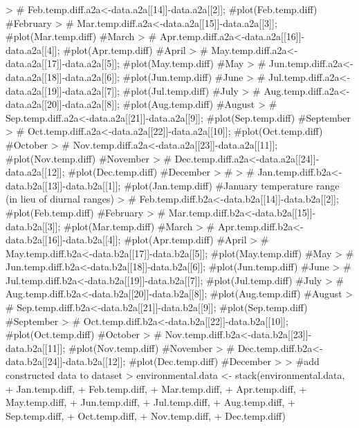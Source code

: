 \documentclass[10pt]{article}
\renewenvironment{Schunk}{\vspace{\topsep}}{\vspace{\topsep}}
\begin{document}
\begin{Schunk}
\begin{Sinput}
> # Feb.temp.diff.a2a<-data.a2a[[14]]-data.a2a[[2]];  #plot(Feb.temp.diff)  #February
> # Mar.temp.diff.a2a<-data.a2a[[15]]-data.a2a[[3]];  #plot(Mar.temp.diff)  #March
> # Apr.temp.diff.a2a<-data.a2a[[16]]-data.a2a[[4]];  #plot(Apr.temp.diff)  #April
> # May.temp.diff.a2a<-data.a2a[[17]]-data.a2a[[5]];  #plot(May.temp.diff)  #May
> # Jun.temp.diff.a2a<-data.a2a[[18]]-data.a2a[[6]];  #plot(Jun.temp.diff)  #June
> # Jul.temp.diff.a2a<-data.a2a[[19]]-data.a2a[[7]];  #plot(Jul.temp.diff)  #July
> # Aug.temp.diff.a2a<-data.a2a[[20]]-data.a2a[[8]];  #plot(Aug.temp.diff)  #August
> # Sep.temp.diff.a2a<-data.a2a[[21]]-data.a2a[[9]];  #plot(Sep.temp.diff)  #September
> # Oct.temp.diff.a2a<-data.a2a[[22]]-data.a2a[[10]]; #plot(Oct.temp.diff)  #October
> # Nov.temp.diff.a2a<-data.a2a[[23]]-data.a2a[[11]]; #plot(Nov.temp.diff)  #November
> # Dec.temp.diff.a2a<-data.a2a[[24]]-data.a2a[[12]]; #plot(Dec.temp.diff)  #December
> # 
> # Jan.temp.diff.b2a<-data.b2a[[13]]-data.b2a[[1]];  #plot(Jan.temp.diff)  #January temperature range (in lieu of diurnal ranges)
> # Feb.temp.diff.b2a<-data.b2a[[14]]-data.b2a[[2]];  #plot(Feb.temp.diff)  #February
> # Mar.temp.diff.b2a<-data.b2a[[15]]-data.b2a[[3]];  #plot(Mar.temp.diff)  #March
> # Apr.temp.diff.b2a<-data.b2a[[16]]-data.b2a[[4]];  #plot(Apr.temp.diff)  #April
> # May.temp.diff.b2a<-data.b2a[[17]]-data.b2a[[5]];  #plot(May.temp.diff)  #May
> # Jun.temp.diff.b2a<-data.b2a[[18]]-data.b2a[[6]];  #plot(Jun.temp.diff)  #June
> # Jul.temp.diff.b2a<-data.b2a[[19]]-data.b2a[[7]];  #plot(Jul.temp.diff)  #July
> # Aug.temp.diff.b2a<-data.b2a[[20]]-data.b2a[[8]];  #plot(Aug.temp.diff)  #August
> # Sep.temp.diff.b2a<-data.b2a[[21]]-data.b2a[[9]];  #plot(Sep.temp.diff)  #September
> # Oct.temp.diff.b2a<-data.b2a[[22]]-data.b2a[[10]]; #plot(Oct.temp.diff)  #October
> # Nov.temp.diff.b2a<-data.b2a[[23]]-data.b2a[[11]]; #plot(Nov.temp.diff)  #November
> # Dec.temp.diff.b2a<-data.b2a[[24]]-data.b2a[[12]]; #plot(Dec.temp.diff)  #December
> 
> #add constructed data to dataset
> environmental.data <- stack(environmental.data,
+                             Jan.temp.diff,
+                             Feb.temp.diff,
+                             Mar.temp.diff,
+                             Apr.temp.diff,
+                             May.temp.diff,
+                             Jun.temp.diff,
+                             Jul.temp.diff,
+                             Aug.temp.diff,
+                             Sep.temp.diff,
+                             Oct.temp.diff,
+                             Nov.temp.diff,
+                             Dec.temp.diff)

\end{Sinput}
\end{Schunk}
\end{document}
